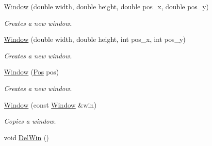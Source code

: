 \begin{DoxyCompactItemize}
\hyperlink{classostendo_1_1Window_ab6788bb11963c0985833e93102e06b54}{Window} (double width, double height, double pos\+\_\+x, double pos\+\_\+y)
\begin{DoxyCompactList}\small\item\em Creates a new window. \end{DoxyCompactList}\item 
\hyperlink{classostendo_1_1Window_acdd8f7fe6ea1dd1f2c0369f70ec9f7f0}{Window} (double width, double height, int pos\+\_\+x, int pos\+\_\+y)
\begin{DoxyCompactList}\small\item\em Creates a new window. \end{DoxyCompactList}\item 
\hyperlink{classostendo_1_1Window_a24f1dce7d66fb8ffec6d36e191656ec9}{Window} (\hyperlink{structostendo_1_1Pos}{Pos} pos)
\begin{DoxyCompactList}\small\item\em Creates a new window. \end{DoxyCompactList}\item 
\hyperlink{classostendo_1_1Window_a28c857e8a69f68ee27b291e72e1053fb}{Window} (const \hyperlink{classostendo_1_1Window}{Window} \&win)
\begin{DoxyCompactList}\small\item\em Copies a window. \end{DoxyCompactList}\item 
void \hyperlink{classostendo_1_1Window_a4d2cdcaf3c4a781e7c0e46b52c693e54}{Del\+Win} ()\hypertarget{classostendo_1_1Window_a4d2cdcaf3c4a781e7c0e46b52c693e54}{}\label{classostendo_1_1Window_a4d2cdcaf3c4a781e7c0e46b52c693e54}


\end{DoxyCompactItemize}
